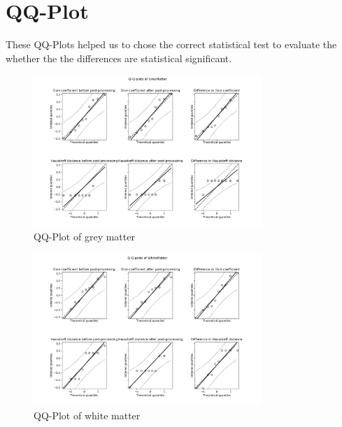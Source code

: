 \documentclass[journal]{IEEEtran}
\begin{document}

%

\newpage
\appendices
\section{QQ-Plot}
\label{sec_qq}
These QQ-Plots helped us to chose the correct statistical test to evaluate the whether the the differences are statistical significant. 

\begin{figure}[ht]
\centering
\includegraphics[width=3.4in]{img/QQ_plots_PKF/GreyMatter.png}
\caption{QQ-Plot of grey matter}
\label{fig_qq_gm}
\end{figure}

\begin{figure}[ht]
\centering
\includegraphics[width=3.4in]{img/QQ_plots_PKF/WhiteMatter.png}
\caption{QQ-Plot of white matter}
\label{fig_qq_wm}
\end{figure}
\end{document}
